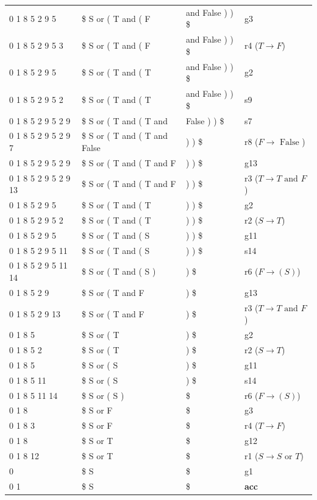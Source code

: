 \documentclass[12pt, letterpaper]{article}
\begin{document}
\begin{enumerate}
\begin{longtable}{p{3.6cm}p{4.0cm}p{4.5cm}>{\raggedright\arraybackslash}p{3.6cm}}
0 1 8 5 2 9 5 & \$ S or ( T and ( F & and False ) ) \$ & g3 \\
0 1 8 5 2 9 5 3 & \$ S or ( T and ( F & and False ) ) \$ & r4 ($T \to F$) \\
0 1 8 5 2 9 5 & \$ S or ( T and ( T & and False ) ) \$ & g2 \\
0 1 8 5 2 9 5 2 & \$ S or ( T and ( T & and False ) ) \$ & s9 \\
0 1 8 5 2 9 5 2 9 & \$ S or ( T and ( T and & False ) ) \$ & s7 \\
0 1 8 5 2 9 5 2 9 7 & \$ S or ( T and ( T and False & ) ) \$ & r8 ($F \to \text{ False }$) \\
0 1 8 5 2 9 5 2 9 & \$ S or ( T and ( T and F & ) ) \$ & g13 \\
0 1 8 5 2 9 5 2 9 13 & \$ S or ( T and ( T and F & ) ) \$ & r3 ($T \to T \text{ and } F$) \\
0 1 8 5 2 9 5 & \$ S or ( T and ( T & ) ) \$ & g2 \\
0 1 8 5 2 9 5 2 & \$ S or ( T and ( T & ) ) \$ & r2 ($S \to T$) \\
0 1 8 5 2 9 5 & \$ S or ( T and ( S & ) ) \$ & g11 \\
0 1 8 5 2 9 5 11 & \$ S or ( T and ( S & ) ) \$ & s14 \\
0 1 8 5 2 9 5 11 14 & \$ S or ( T and ( S ) & ) \$ & r6 ($F \to ( S )$) \\
0 1 8 5 2 9 & \$ S or ( T and F & ) \$ & g13 \\
0 1 8 5 2 9 13 & \$ S or ( T and F & ) \$ & r3 ($T \to T \text{ and } F$) \\
0 1 8 5 & \$ S or ( T & ) \$ & g2 \\
0 1 8 5 2 & \$ S or ( T & ) \$ & r2 ($S \to T$) \\
0 1 8 5 & \$ S or ( S & ) \$ & g11 \\
0 1 8 5 11 & \$ S or ( S & ) \$ & s14 \\
0 1 8 5 11 14 & \$ S or ( S ) & \$ & r6 ($F \to ( S )$) \\
0 1 8 & \$ S or F & \$ & g3 \\
0 1 8 3 & \$ S or F & \$ & r4 ($T \to F$) \\
0 1 8 & \$ S or T & \$ & g12 \\
0 1 8 12 & \$ S or T & \$ & r1 ($S \to S \text{ or } T$) \\
0 & \$ S & \$ & g1 \\
0 1 & \$ S & \$ & \textbf{acc} \\
\bottomrule
\end{longtable}
\endgroup


\end{enumerate}
\end{document}
